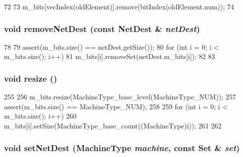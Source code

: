 \begin{DoxyCode}
72 {
73     m_bits[vecIndex(oldElement)].remove(bitIndex(oldElement.num));
74 }
\end{DoxyCode}
\hypertarget{classNetDest_af6e6cf2f93ba297eb841f1518f3bbb7a}{
\subsubsection[{removeNetDest}]{\setlength{\rightskip}{0pt plus 5cm}void removeNetDest (const {\bf NetDest} \& {\em netDest})}}
\label{classNetDest_af6e6cf2f93ba297eb841f1518f3bbb7a}



\begin{DoxyCode}
78 {
79     assert(m_bits.size() == netDest.getSize());
80     for (int i = 0; i < m_bits.size(); i++) {
81         m_bits[i].removeSet(netDest.m_bits[i]);
82     }
83 }
\end{DoxyCode}
\hypertarget{classNetDest_a0fc3d585aa53859602ac79c9c421f2a9}{
\subsubsection[{resize}]{\setlength{\rightskip}{0pt plus 5cm}void resize ()}}
\label{classNetDest_a0fc3d585aa53859602ac79c9c421f2a9}



\begin{DoxyCode}
255 {
256     m_bits.resize(MachineType_base_level(MachineType_NUM));
257     assert(m_bits.size() == MachineType_NUM);
258 
259     for (int i = 0; i < m_bits.size(); i++) {
260         m_bits[i].setSize(MachineType_base_count((MachineType)i));
261     }
262 }
\end{DoxyCode}
\hypertarget{classNetDest_a5c762cca91b20b0ef2912214cbebf301}{
\subsubsection[{setNetDest}]{\setlength{\rightskip}{0pt plus 5cm}void setNetDest (MachineType {\em machine}, \/  const {\bf Set} \& {\em set})}}
\label{classNetDest_a5c762cca91b20b0ef2912214cbebf301}



